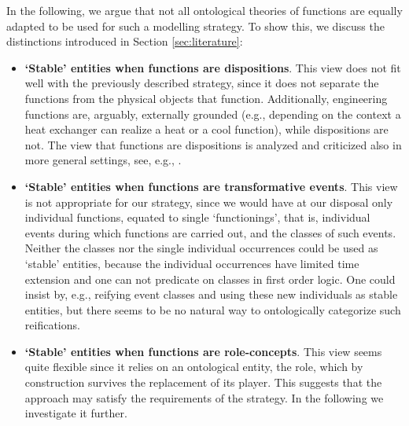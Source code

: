 \documentclass[
]{ceurart}
\begin{document}
In the following, we argue that not all ontological theories of functions are equally adapted to be used for such a modelling strategy. To show this, we discuss the distinctions introduced in Section \ref{sec:literature}: 
\begin{itemize}
  \item \textbf{`Stable' entities when functions are dispositions}. This view does not fit well with the previously described strategy, since it does not separate the functions from the physical objects that function. Additionally, engineering functions are, arguably, externally grounded (e.g., depending on the context a heat exchanger can realize a heat or a cool function), while dispositions are not. The view that functions are dispositions is analyzed and criticized also in more general settings, see, e.g., \cite{rohlWhyFunctionsAre2014}. %
  \item \textbf{`Stable' entities when functions are transformative events}. %
   This view is not appropriate  %
   for our strategy, since we would have at our disposal only individual functions, equated to single `functionings', that is, individual events during which functions are carried out, and the classes of such events. Neither the classes nor the single individual occurrences could be used as `stable' entities, because the individual occurrences have limited time extension and one can not predicate on classes in first order logic.
   One could insist by, e.g., reifying event classes and using these new individuals as stable entities, but there seems to be no natural way to ontologically categorize such reifications. 
  \item \textbf{`Stable' entities when functions are role-concepts}. This view seems quite flexible since it relies on an ontological entity, the role, which by construction survives the replacement of its player. This suggests that the approach may satisfy the requirements of the strategy. In the following we investigate it further.
\end{itemize}
\end{document}
